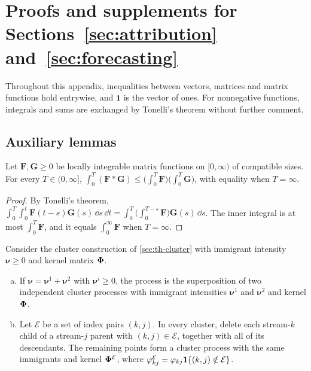 \section{Proofs and supplements for Sections~\ref{sec:attribution} and~\ref{sec:forecasting}}\label{app:attrproofs}

Throughout this appendix, inequalities between vectors, matrices and matrix functions
hold entrywise, and $\mathbf 1$ is the vector of ones. For nonnegative functions,
integrals and sums are exchanged by Tonelli's theorem without further comment.

\subsection{Auxiliary lemmas}\label{app:at-aux}

\begin{lemma}\label{lem:at-young}
Let $\bm F,\bm G\ge0$ be locally integrable matrix functions on $[0,\infty)$ of
compatible sizes. For every $T\in(0,\infty]$,
$\int_0^T(\bm F*\bm G)\le\bigl(\int_0^T\bm F\bigr)\bigl(\int_0^T\bm G\bigr)$, with
equality when $T=\infty$.
\end{lemma}

\begin{proof}
By Tonelli's theorem,
$\int_0^T\!\int_0^t\bm F(t-s)\bm G(s)\,\dd s\,\dd t=\int_0^T\bigl(\int_0^{T-s}\bm F\bigr)\bm G(s)\,\dd s$.
The inner integral is at most $\int_0^T\bm F$, and it equals $\int_0^\infty\bm F$ when
$T=\infty$.
\end{proof}

\begin{lemma}\label{lem:at-split}
Consider the cluster construction of \cref{sec:th-cluster} with immigrant intensity
$\bm\nu\ge0$ and kernel matrix $\bm{\Phi}$.
\begin{enumerate}[(a)]
  \item If $\bm\nu=\bm\nu^1+\bm\nu^2$ with $\bm\nu^i\ge0$, the process is the
  superposition of two independent cluster processes with immigrant intensities
  $\bm\nu^1$ and $\bm\nu^2$ and kernel $\bm{\Phi}$.
  \item Let $\mathcal E$ be a set of index pairs $(k,j)$. In every cluster, delete each
  stream-$k$ child of a stream-$j$ parent with $(k,j)\in\mathcal E$, together with all
  of its descendants. The remaining points form a cluster process with the same
  immigrants and kernel $\bm{\Phi}^{\mathcal E}$, where
  $\varphi^{\mathcal E}_{kj}=\varphi_{kj}\mathbf{1}\!\left\{(k,j)\notin\mathcal E\right\}$.
\end{enumerate}
\end{lemma}


